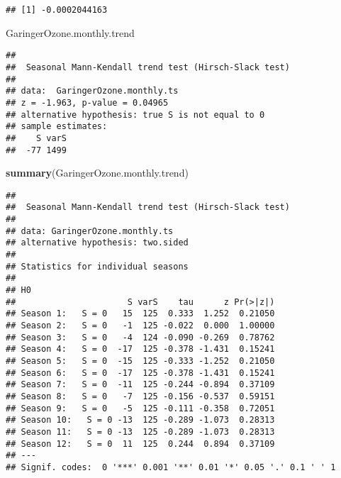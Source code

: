 \documentclass[]{article}
\newenvironment{Shaded}{\begin{snugshade}}{\end{snugshade}}
\newcommand{\KeywordTok}[1]{\textcolor[rgb]{0.13,0.29,0.53}{\textbf{#1}}}
\newcommand{\NormalTok}[1]{#1}
\begin{document}
\begin{verbatim}
## [1] -0.0002044163
\end{verbatim}

\begin{Shaded}
\begin{Highlighting}[]
\NormalTok{GaringerOzone.monthly.trend}
\end{Highlighting}
\end{Shaded}

\begin{verbatim}
## 
##  Seasonal Mann-Kendall trend test (Hirsch-Slack test)
## 
## data:  GaringerOzone.monthly.ts
## z = -1.963, p-value = 0.04965
## alternative hypothesis: true S is not equal to 0
## sample estimates:
##    S varS 
##  -77 1499
\end{verbatim}

\begin{Shaded}
\begin{Highlighting}[]
\KeywordTok{summary}\NormalTok{(GaringerOzone.monthly.trend)}
\end{Highlighting}
\end{Shaded}

\begin{verbatim}
## 
##  Seasonal Mann-Kendall trend test (Hirsch-Slack test)
## 
## data: GaringerOzone.monthly.ts
## alternative hypothesis: two.sided
## 
## Statistics for individual seasons
## 
## H0
##                      S varS    tau      z Pr(>|z|)  
## Season 1:   S = 0   15  125  0.333  1.252  0.21050  
## Season 2:   S = 0   -1  125 -0.022  0.000  1.00000  
## Season 3:   S = 0   -4  124 -0.090 -0.269  0.78762  
## Season 4:   S = 0  -17  125 -0.378 -1.431  0.15241  
## Season 5:   S = 0  -15  125 -0.333 -1.252  0.21050  
## Season 6:   S = 0  -17  125 -0.378 -1.431  0.15241  
## Season 7:   S = 0  -11  125 -0.244 -0.894  0.37109  
## Season 8:   S = 0   -7  125 -0.156 -0.537  0.59151  
## Season 9:   S = 0   -5  125 -0.111 -0.358  0.72051  
## Season 10:   S = 0 -13  125 -0.289 -1.073  0.28313  
## Season 11:   S = 0 -13  125 -0.289 -1.073  0.28313  
## Season 12:   S = 0  11  125  0.244  0.894  0.37109  
## ---
## Signif. codes:  0 '***' 0.001 '**' 0.01 '*' 0.05 '.' 0.1 ' ' 1
\end{verbatim}
\end{document}
